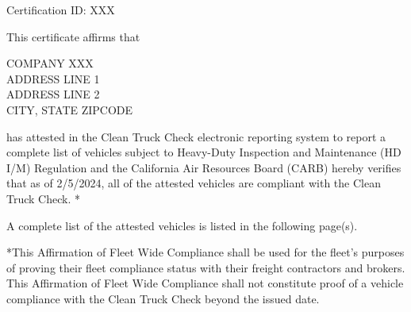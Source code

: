 {
    \setlength{\parskip}{\baselineskip}
    \setlength{\parindent}{0pt}

    Certification ID: XXX

    This certificate affirms that

    COMPANY XXX \\
    ADDRESS LINE 1 \\
    ADDRESS LINE 2 \\
    CITY, STATE ZIPCODE

    has attested in the Clean Truck Check electronic reporting system to report
    a complete list of vehicles subject to Heavy-Duty Inspection and Maintenance
    (HD I/M) Regulation and the California Air Resources Board (CARB) hereby
    verifies that as of 2/5/2024, all of the attested vehicles are compliant
    with the Clean Truck Check. *

    A complete list of the attested vehicles is listed in the following page(s).

    *This Affirmation of Fleet Wide Compliance shall be used for the fleet's
    purposes of proving their fleet compliance status with their freight
    contractors and brokers. This Affirmation of Fleet Wide Compliance shall not
    constitute proof of a vehicle compliance with the Clean Truck Check beyond
    the issued date.
}